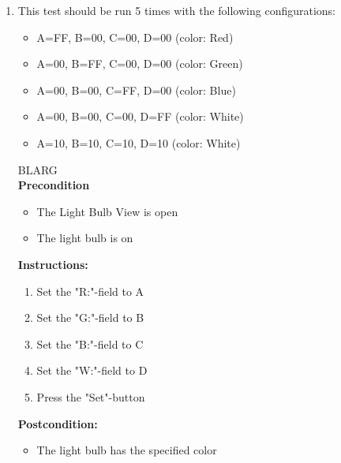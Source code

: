 \documentclass[a4paper]{article}
\newlength{\testlabellength}
\newenvironment{testlist}{\begin{enumerate}[label=\bfseries Instruction \thesubsection.\arabic* , labelindent=0pt, labelwidth=\testlabellength , leftmargin=2cm]}{\end{enumerate}}
\newenvironment{precondition}{
{\color{white}BLARG}\\ 
\textbf{Precondition}
\begin{itemize}[labelindent=0cm, labelwidth=2cm , leftmargin=1cm]
}
{\end{itemize}}
\newenvironment{instruction}{
\textbf{Instructions:}
\begin{enumerate}[label=\bfseries  \arabic*., labelindent=0cm, labelwidth=2cm , leftmargin=1cm]
}
{\end{enumerate}}
\newenvironment{postcondition}{
\textbf{Postcondition:}
\begin{itemize}[labelindent=0cm, labelwidth=2cm , leftmargin=1cm]
}
{\end{itemize}}
\begin{document}
\begin{appendices}
\begin{testlist}
	\item This test should be run 5 times with the following configurations:
		\begin{itemize}
			\item A=FF, B=00, C=00, D=00 (color: Red)
			\item A=00, B=FF, C=00, D=00 (color: Green)
			\item A=00, B=00, C=FF, D=00 (color: Blue)
			\item A=00, B=00, C=00, D=FF (color: White)
			\item A=10, B=10, C=10, D=10 (color: White)
		\end{itemize}
		\begin{precondition}
			\item The Light Bulb View is open
			\item The light bulb is on
		\end{precondition}
		\begin{instruction}
			\item Set the "R:"-field to A
			\item Set the "G:"-field to B
			\item Set the "B:"-field to C
			\item Set the "W:"-field to D
			\item Press the "Set"-button
		\end{instruction}
		\begin{postcondition}
			\item The light bulb has the specified color
		\end{postcondition}
		


\end{testlist}
\end{appendices}
\end{document}
